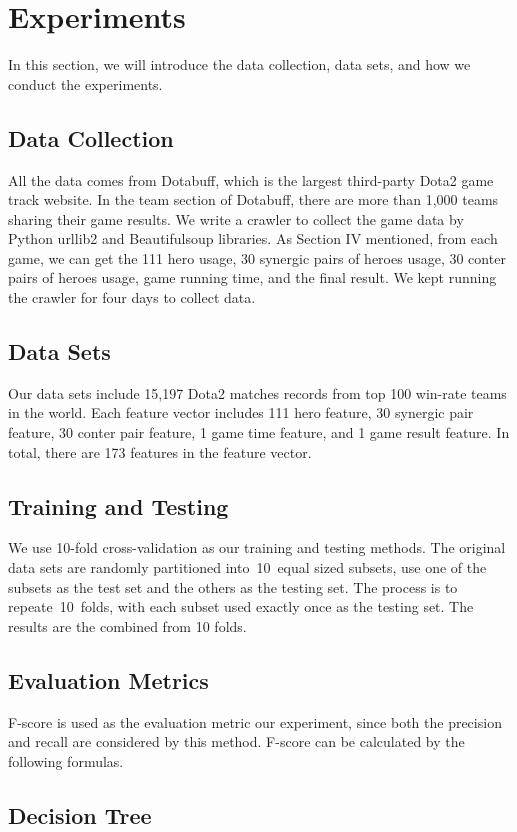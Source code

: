 \section{Experiments}
In this section, we will introduce the data collection, data sets, and how we conduct the experiments.
\subsection{Data Collection}
All the data comes from Dotabuff, which is the largest third-party Dota2 game track website.
In the team section of Dotabuff, there are more than 1,000 teams sharing their game results.
We write a crawler to collect the game data by Python urllib2 and Beautifulsoup libraries.
As Section IV mentioned, from each game, we can get the 111 hero usage, 30 synergic pairs of heroes usage,
30 conter pairs of heroes usage, game running time, and the final result.
We kept running the crawler for four days to collect data.
\subsection{Data Sets}
Our data sets include 15,197 Dota2 matches records from top 100 win-rate teams in the world.
Each feature vector includes 111 hero feature, 30 synergic pair feature, 30 conter pair feature,
1 game time feature, and 1 game result feature.
In total, there are 173 features in the feature vector.

\subsection{Training and Testing}
We use 10-fold cross-validation as our training and testing methods.
The original data sets are randomly partitioned into 10 equal sized subsets, use one of the subsets as the test set and the others as the testing set.
The process is to repeate 10 folds, with each subset used exactly once as the testing set.
The results are the combined from 10 folds.

\subsection{Evaluation Metrics}
F-score is used as the evaluation metric our experiment, since both the precision and recall are considered by this method.
F-score can be calculated by the following formulas.

\subsection{Decision Tree}
